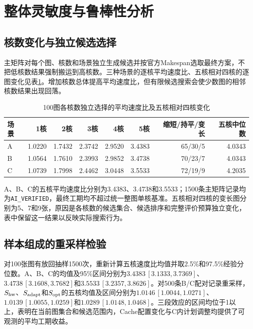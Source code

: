\section{整体灵敏度与鲁棒性分析}
\label{sec:overall-sensitivity}

\subsection{核数变化与独立候选选择}
主矩阵对每个图、核数和场景独立生成候选并按官方Makespan选取最终方案，不把低核数结果强制搬运到高核数。三种场景的逐核平均速度比、五核相对四核的逐图变化见表\ref{tab:best-core-choice}。增加核数总体提高平均速度比，但有限候选搜索会使少数图的相邻核数结果出现回落。
\begin{table}[H]\centering\small
\caption{100图各核数独立选择的平均速度比及五核相对四核变化}\label{tab:best-core-choice}
\begin{tabular}{lrrrrrrr}\toprule
场景 & 1核 & 2核 & 3核 & 4核 & 5核 & 缩短/持平/变长 & 五核中位数\\\midrule
A & 1.0220 & 1.7432 & 2.3742 & 2.9520 & 3.4383 & 65/30/5 & 4.0343\\
B & 1.0564 & 1.7610 & 2.3993 & 2.9852 & 3.4738 & 70/23/7 & 4.0343\\
C & 1.0739 & 1.7998 & 2.4462 & 3.0448 & 3.5533 & 72/19/9 & 4.2035\\\bottomrule
\end{tabular}\end{table}
A、B、C的五核平均速度比分别为3.4383、3.4738和3.5533；1500条主矩阵记录均为\texttt{AI\_VERIFIED}，最终工期均不超过统一整图单核基准。五核相对四核的变长图分别为5、7和9张，原因是各核数的候选集合、候选排序和完整评价预算独立变化，表中保留这一结果以反映实际搜索行为。

\subsection{样本组成的重采样检验}
对100张图有放回抽样1500次，重新计算五核速度比均值并取2.5\%和97.5\%经验分位数。A、B、C的均值及95\%区间分别为$3.4383\,[3.1333,3.7369]$、$3.4738\,[3.1608,3.7682]$和$3.5533\,[3.2357,3.8626]$。对500条B/C配对记录重采样，$S_{\rm hw}$、$S_{\rm adapt}$和$S_{\rm opt}$的五核均值及区间分别为$1.0146\,[1.0044,1.0271]$、$1.0139\,[1.0055,1.0259]$和$1.0289\,[1.0148,1.0468]$。三段效应的区间均位于1以上，表明在当前图集合和候选范围内，Cache配置变化与C内计划调整均提供了可观测的平均工期收益。

